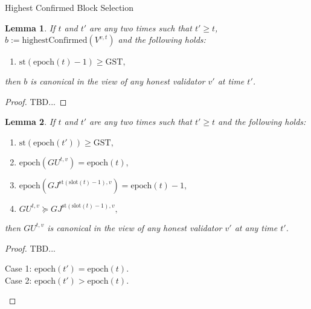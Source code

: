 \documentclass{article}
\newtheorem{lemma}{Lemma}
\begin{document}
\begin{algorithm}[H]
\SetAlgoNoLine
{}
\caption{Highest Confirmed Block Selection}
\end{algorithm}

\begin{lemma}
    If $t$ and $t'$ are any two times such that $t' \geq t$, $b := \text{highestConfirmed}(V^{v,t})$ and the following holds:
    
    \begin{enumerate}
        \item $\text{st}(\text{epoch}(t) - 1) \geq \text{GST},$
    \end{enumerate}
    
    then $b$ is canonical in the view of any honest validator $v'$ at time $t'$.
\end{lemma}

\begin{proof}
    TBD...
\end{proof}


\begin{lemma}
    If $t$ and $t'$ are any two times such that $t' \geq t$ and the following holds:
    
    \begin{enumerate}
        \item $\text{st}(\text{epoch}(t')) \geq \text{GST},$
        \item $\text{epoch}(GU^{t,v}) = \text{epoch}(t),$
        \item $\text{epoch}(GJ^{\text{st}(\text{slot}(t)-1),v}) = \text{epoch}(t) - 1,$
        \item $GU^{t,v} \succeq GJ^{\text{st}(\text{slot}(t)-1),v},$
    \end{enumerate}
    
then $GU^{t,v}$ is canonical in the view of any honest validator $v'$ at any time $t'$.
\end{lemma}

\begin{proof}
    TBD...

    \begin{description}
        \item[Case 1: $\text{epoch}(t') = \text{epoch}(t)$.]
        \item[Case 2: $\text{epoch}(t') > \text{epoch}(t)$.]  
    \end{description}
\end{proof}
\end{document}
